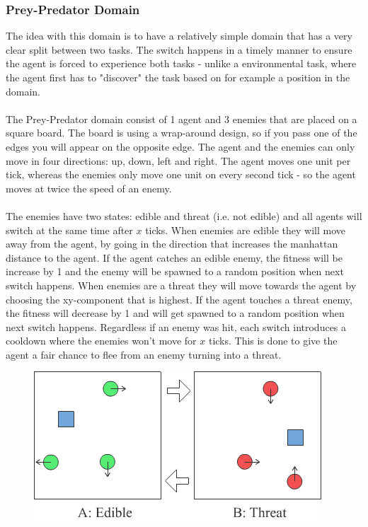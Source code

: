 \documentclass[11pt, a4paper]{article}
\begin{document}
\subsubsection{Prey-Predator Domain}
The idea with this domain is to have a relatively simple domain that has a very clear split between two tasks. The switch happens in a timely manner to ensure the agent is forced to experience both tasks - unlike a environmental task, where the agent first has to "discover" the task based on for example a position in the domain.
\\
\\
The Prey-Predator domain consist of 1 agent and 3 enemies that are placed on a square board. The board is using a wrap-around design, so if you pass one of the edges you will appear on the opposite edge. The agent and the enemies can only move in four directions: up, down, left and right. The agent moves one unit per tick, whereas the enemies only move one unit on every second tick - so the agent moves at twice the speed of an enemy.
\\
\\
The enemies have two states: edible and threat (i.e. not edible) and all agents will switch at the same time after $ x $ ticks. When enemies are edible they will move away from the agent, by going in the direction that increases the manhattan distance to the agent. If the agent catches an edible enemy, the fitness will be increase by 1 and the enemy will be spawned to a random position when next switch happens. When enemies are a threat they will move towards the agent by choosing the xy-component that is highest. If the agent touches a threat enemy, the fitness will decrease by 1 and will get spawned to a random position when next switch happens. Regardless if an enemy was hit, each switch introduces a cooldown where the enemies won't move for $ x $ ticks. This is done to give the agent a fair chance to flee from an enemy turning into a threat.
\begin{figure}[!ht]
\centering
\includegraphics[scale=0.5]{PreyPredatorDomain}
\caption{}
\end{figure}
\end{document}
